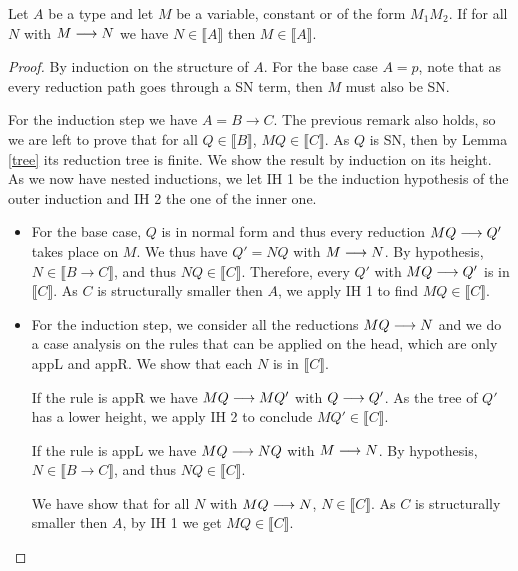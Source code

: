 \documentclass[]{StandardTemplate}
\begin{document}
\begin{prop}[]
  \label{prop:1}
  Let $ A $ be a type and let $ M $ be a variable, constant or of the form $ M_1 M_2 $. If for all $ N $ with $M \longrightarrow N $ we have $ N \in \llbracket A \rrbracket $ then $M \in \llbracket A \rrbracket $.
\end{prop}
\begin{proof}
  By induction on the structure of $ A $. For the base case $ A = p $, note that as every reduction path goes through a SN term, then $ M $ must also be SN.

  For the induction step we have $ A = B \to C $. The previous remark also holds, so we are left to prove that for all $ Q\in \llbracket B \rrbracket $, $ M Q \in \llbracket C \rrbracket $. As $ Q $ is SN, then by Lemma \ref{tree} its reduction tree is finite. We show the result by induction on its height. As we now have nested inductions, we let IH 1 be the induction hypothesis of the outer induction and IH 2 the one of the inner one.

  \begin{itemize}
  \item For the base case, $ Q $ is in normal form and thus every reduction $ M Q \longrightarrow Q'  $ takes place on $ M $. We thus have $ Q' = N Q $ with $ M \longrightarrow N $. By hypothesis, $ N \in \llbracket B \to C \rrbracket$, and thus $ N Q \in \llbracket C \rrbracket $. Therefore, every $ Q' $ with $ M Q \longrightarrow Q' $ is in $ \llbracket C \rrbracket $. As $ C $ is structurally smaller then $ A $, we apply IH 1 to find $ MQ \in \llbracket  C \rrbracket $.
  \item For the induction step, we consider all the reductions $ M Q \longrightarrow N $ and we do a case analysis on the rules that can be applied on the head, which are only appL and appR. We show that each $ N $ is in $ \llbracket C \rrbracket $.

    If the rule is appR we have $ M Q \longrightarrow M Q' $ with $ Q \longrightarrow Q' $. As the tree of $ Q' $ has a lower height, we apply IH 2 to conclude $ M Q' \in \llbracket C \rrbracket $.
    
    If the rule is appL we have $ M Q \longrightarrow N Q $ with $ M \longrightarrow N $. By hypothesis, $ N \in \llbracket B \to C \rrbracket$, and thus $ N Q \in \llbracket C \rrbracket $.

    We have show that for all $ N $ with $ M Q \longrightarrow N $, $ N \in \llbracket C \rrbracket $. As $ C $ is structurally smaller then $ A $, by IH 1 we get $ MQ \in \llbracket  C \rrbracket $.
   \end{itemize}
 \end{proof}
\end{document}
